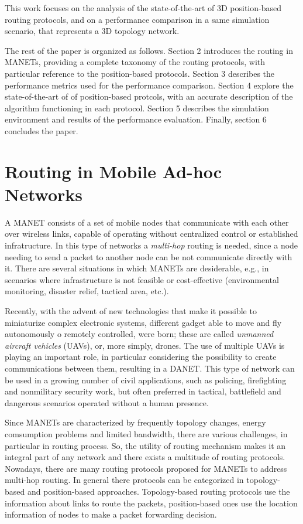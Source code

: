 \documentclass[journal,comsoc]{IEEEtran}
\begin{document}
This work focuses on the analysis of the state-of-the-art of 3D position-based routing protocols, and on a performance comparison in a same simulation scenario, that represents a 3D topology network. 
\par The rest of the paper is organized as follows. Section 2 introduces the routing in MANETs, providing a complete taxonomy of the routing protocols, with particular reference to the position-based protocols. Section 3 describes the performance metrics used for the performance comparison. Section 4 explore the state-of-the-art of of position-based protcols, with an accurate description of the algorithm functioning in each protocol. Section 5 describes the simulation environment and results of the performance evaluation. Finally, section 6 concludes the paper.

\section{Routing in Mobile Ad-hoc Networks}
A MANET consists of a set of mobile nodes that communicate with each other over wireless links, capable of operating without centralized control or established infratructure. In this type of networks a \emph{multi-hop} routing is needed, since a node needing to send a packet to another node can be not communicate directly with it. There are several situations in which MANETs are desiderable, e.g., in scenarios where infrastructure is not feasible or cost-effective (environmental monitoring, disaster relief, tactical area, etc.).
\par Recently, with the advent of new technologies that make it possible to miniaturize complex electronic systems, different gadget able to move and fly autonomously o remotely controlled, were born; these are called \emph{unmanned aircraft vehicles} (UAVs), or, more simply, drones. The use of multiple UAVs is playing an important role, in particular considering the possibility to create communications between them, resulting in a DANET. This type of network can be used in a growing number of civil applications, such as policing, firefighting and nonmilitary security work, but often preferred in tactical, battlefield and dangerous scenarios operated without a human presence.
\par Since MANETs are characterized by frequently topology changes, energy comsumption problems and limited bandwidth, there are various challenges, in particular in routing process. So, the utility of routing mechanism makes it an integral part of any network and there exists a multitude of routing protocols. Nowadays, there are many routing protocols proposed for MANETs to address multi-hop routing. In general there protocols can be categorized in topology-based and position-based approaches. Topology-based routing protocols use the information about links to route the packets, position-based ones use the location information of nodes to make a packet forwarding decision.
\end{document}
